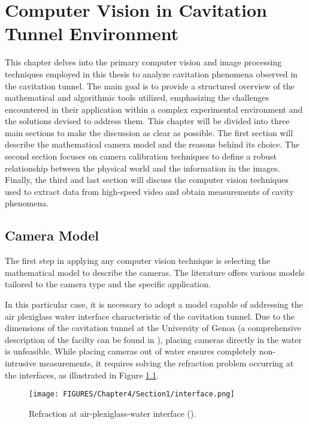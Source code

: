 \chapter{Computer Vision in Cavitation Tunnel Environment}
\label{chap:chapter4}

This chapter delves into the primary computer vision and image processing techniques employed in this thesis to analyze cavitation phenomena observed in the cavitation tunnel. The main goal is to provide a structured overview of the mathematical and algorithmic tools utilized, emphasizing the challenges encountered in their application within a complex experimental environment and the solutions devised to address them.
This chapter will be divided into three main sections to make the discussion as clear as possible. The first section will describe the mathematical camera model and the reasons behind its choice. The second section focuses on camera calibration techniques to define a robust relationship between the physical world and the information in the images. Finally, the third and last section will discuss the computer vision techniques used to extract data from high-speed video and obtain measurements of cavity phenomena.

\section{Camera Model}

The first step in applying any computer vision technique is selecting the mathematical model to describe the cameras.
The literature offers various models tailored to the camera type and the specific application.

In this particular case, it is necessary to adopt a model capable of addressing the air plexiglass water interface characteristic of the cavitation tunnel. Due to the dimensions of the cavitation tunnel at the University of Genoa (a comprehensive description of the facilty can be found in \cite{Tani2017}), placing cameras directly in the water is unfeasible. While placing cameras out of water ensures completely non-intrusive measurements, it requires solving the refraction problem occurring at the interfaces, as illustrated in Figure \ref{fig:interface}.

\begin{figure}[htbp]
    \centering
    \texttt{[image: FIGURES/Chapter4/Section1/interface.png]} 
    \caption{Refraction at air-plexiglass-water interface (\cite{Sedlazeck2012}).} 
    \label{fig:interface}  
\end{figure}

